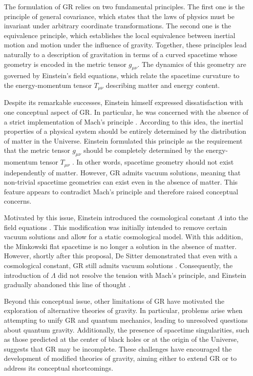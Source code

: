 \documentclass[floats,floatfix,aps, preprintnumbers,nofootinbib]{revtex4-2}
\begin{document}
The formulation of GR relies on two fundamental principles. The first one is the principle of general covariance, which states that the laws of physics must be invariant under arbitrary coordinate transformations. The second one is the equivalence principle, which establishes the local equivalence between inertial motion and motion under the influence of gravity. Together, these principles lead naturally to a description of gravitation in terms of a curved spacetime whose geometry is encoded in the metric tensor $g_{\mu\nu}$. The dynamics of this geometry are governed by Einstein's field equations, which relate the spacetime curvature to the energy-momentum tensor $T_{\mu\nu}$ describing matter and energy content.

Despite its remarkable successes, Einstein himself expressed dissatisfaction with one conceptual aspect of GR. In particular, he was concerned with the absence of a strict implementation of Mach's principle \cite{Pais2005Subtle}. According to this idea, the inertial properties of a physical system should be entirely determined by the distribution of matter in the Universe. Einstein formulated this principle as the requirement that the metric tensor $g_{\mu\nu}$ should be completely determined by the energy-momentum tensor $T_{\mu\nu}$ \cite{Barbour1995Mach}. In other words, spacetime geometry should not exist independently of matter. However, GR admits vacuum solutions, meaning that non-trivial spacetime geometries can exist even in the absence of matter. This feature appears to contradict Mach's principle and therefore raised conceptual concerns.

Motivated by this issue, Einstein introduced the cosmological constant $\Lambda$ into the field equations \cite{minazzoli:hal-05201686}. This modification was initially intended to remove certain vacuum solutions and allow for a static cosmological model. With this addition, the Minkowski flat spacetime is no longer a solution in the absence of matter. However, shortly after this proposal, De Sitter demonstrated that even with a cosmological constant, GR still admits vacuum solutions \cite{1917KNAB...19.1217D}. Consequently, the introduction of $\Lambda$ did not resolve the tension with Mach's principle, and Einstein gradually abandoned this line of thought \cite{einstein1918kritisches}.

Beyond this conceptual issue, other limitations of GR have motivated the exploration of alternative theories of gravity. In particular, problems arise when attempting to unify GR and quantum mechanics, leading to unresolved questions about quantum gravity. Additionally, the presence of spacetime singularities, such as those predicted at the center of black holes or at the origin of the Universe, suggests that GR may be incomplete. These challenges have encouraged the development of modified theories of gravity, aiming either to extend GR or to address its conceptual shortcomings.
\end{document}
